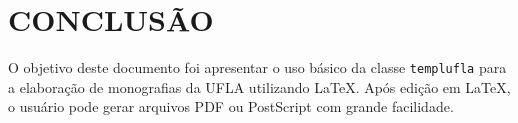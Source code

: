 \chapter{CONCLUSÃO}
\label{cap:conclusao}

O objetivo deste documento foi apresentar o uso básico da classe {\tt templufla} para a elaboração de monografias da UFLA utilizando \LaTeX. Após edição em \LaTeX, o usuário pode gerar arquivos PDF \cite{PDF2004} ou PostScript \cite{PostScript1999} com grande facilidade.


